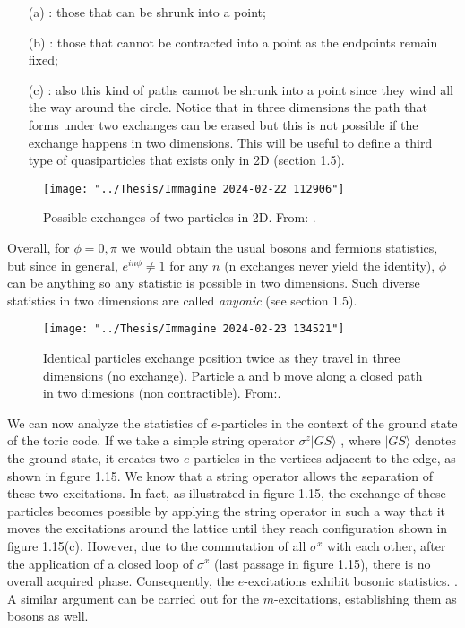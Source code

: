 \documentclass{Configuration_Files/PoliMi3i_thesis}
\begin{document}
\begin{enumerate}
	\item[(a)] : those that can be shrunk into a point;

	\item[(b)] : those that cannot be contracted into a point as the endpoints remain fixed;

	\item[(c)] : also this kind of paths cannot be shrunk into a point since they wind all  the way around the circle. Notice that in three dimensions the path that forms under two exchanges can be erased but this is not possible if the exchange happens in two dimensions. This will be useful to define a third type of quasiparticles that exists only in 2D (section 1.5).
\end{enumerate}

\begin{figure}[H]
	\centering
	\texttt{[image: "../Thesis/Immagine 2024-02-22 112906"]}
	\caption{ { Possible exchanges of two particles in 2D. From: \cite{Rao16}.}}
	\label{fig:immagine-2024-02-22-112906}
\end{figure}

Overall, for $ \phi = 0, \pi$ we would obtain the usual bosons and fermions statistics, but since in general, $e^{in\phi} \neq 1$ for any $n$ (n exchanges never yield the identity), $\phi$ can be anything so any statistic is possible in two dimensions.
Such diverse statistics in two dimensions are called \textit{anyonic} (see section 1.5).\newline


\begin{figure}
	\centering
	\texttt{[image: "../Thesis/Immagine 2024-02-23 134521"]}
	\caption{{ Identical particles exchange position twice as
			they travel in three dimensions (no exchange). Particle a and b move along a closed path in two dimesions (non contractible). From:\cite{Wil91}}.}
	\label{fig:immagine-2024-02-23-134521}
\end{figure}

We can now analyze the statistics of $e$-particles in the context of the ground state of the toric code. If we take a simple string operator $\sigma^z|GS\rangle$ , where $|GS\rangle$ denotes the ground state, it creates two $e$-particles in the vertices adjacent to the edge, as shown in figure 1.15. We know that a string operator allows the separation of these two excitations. In fact, as illustrated in figure 1.15, the exchange of these particles becomes possible by applying the string operator in such a way that it moves the excitations around the lattice until they reach configuration shown in figure 1.15(c). However, due to the commutation of all $\sigma^x$ with each other, after the application of a closed loop of $\sigma^x$ (last passage in figure 1.15), there is no overall acquired phase. Consequently, the $e$-excitations exhibit bosonic statistics. {\cite{Rao16, Her20}}. A similar argument can be carried out for the $m$-excitations, establishing them as bosons as well. 
\end{document}
